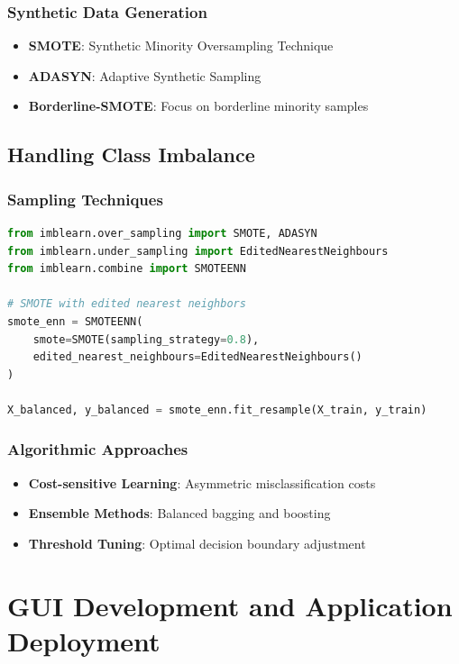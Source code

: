 \documentclass[12pt, a4paper]{article}
\begin{document}
\subsubsection{Synthetic Data Generation}
\begin{itemize}
    \item \textbf{SMOTE}: Synthetic Minority Oversampling Technique
    \item \textbf{ADASYN}: Adaptive Synthetic Sampling
    \item \textbf{Borderline-SMOTE}: Focus on borderline minority samples
\end{itemize}

\subsection{Handling Class Imbalance}

\subsubsection{Sampling Techniques}
\begin{lstlisting}[language=Python, caption=Advanced Imbalance Handling]
from imblearn.over_sampling import SMOTE, ADASYN
from imblearn.under_sampling import EditedNearestNeighbours
from imblearn.combine import SMOTEENN

# SMOTE with edited nearest neighbors
smote_enn = SMOTEENN(
    smote=SMOTE(sampling_strategy=0.8),
    edited_nearest_neighbours=EditedNearestNeighbours()
)

X_balanced, y_balanced = smote_enn.fit_resample(X_train, y_train)
\end{lstlisting}

\subsubsection{Algorithmic Approaches}
\begin{itemize}
    \item \textbf{Cost-sensitive Learning}: Asymmetric misclassification costs
    \item \textbf{Ensemble Methods}: Balanced bagging and boosting
    \item \textbf{Threshold Tuning}: Optimal decision boundary adjustment
\end{itemize}

\section{GUI Development and Application Deployment}
\end{document}
